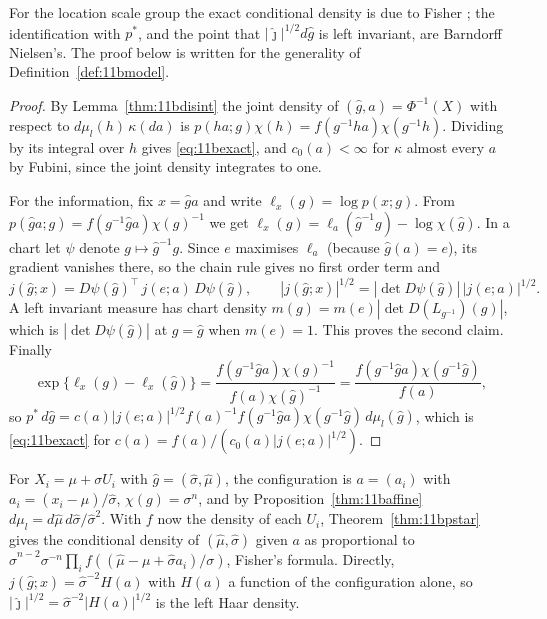 For the location scale group the exact conditional density is due to Fisher \cite{fisher1934}; the identification with $p^*$, and the point that $|\hat\jmath|^{1/2}d\hat g$ is left invariant, are Barndorff Nielsen's. The proof below is written for the generality of Definition~\ref{def:11bmodel}.

\begin{proof}
By Lemma~\ref{thm:11bdisint} the joint density of $(\hat g,a)=\Phi^{-1}(X)$ with respect to $d\mu_l(h)\,\kappa(da)$ is $p(ha;g)\chi(h)=f(g^{-1}ha)\chi(g^{-1}h)$. Dividing by its integral over $h$ gives \eqref{eq:11bexact}, and $c_0(a)<\infty$ for $\kappa$ almost every $a$ by Fubini, since the joint density integrates to one.

For the information, fix $x=\hat g a$ and write $\ell_x(g)=\log p(x;g)$. From $p(\hat ga;g)=f(g^{-1}\hat ga)\chi(g)^{-1}$ we get $\ell_x(g)=\ell_a(\hat g^{-1}g)-\log\chi(\hat g)$. In a chart let $\psi$ denote $g\mapsto\hat g^{-1}g$. Since $e$ maximises $\ell_a$ (because $\hat g(a)=e$), its gradient vanishes there, so the chain rule gives no first order term and
\[
j(\hat g;x)=D\psi(\hat g)^{\top}\,j(e;a)\,D\psi(\hat g),\qquad |j(\hat g;x)|^{1/2}=|\det D\psi(\hat g)|\,|j(e;a)|^{1/2}.
\]
A left invariant measure has chart density $m(g)=m(e)|\det D(L_{g^{-1}})(g)|$, which is $|\det D\psi(\hat g)|$ at $g=\hat g$ when $m(e)=1$. This proves the second claim. Finally
\[
\exp\{\ell_x(g)-\ell_x(\hat g)\}=\frac{f(g^{-1}\hat ga)\chi(g)^{-1}}{f(a)\chi(\hat g)^{-1}}=\frac{f(g^{-1}\hat ga)\chi(g^{-1}\hat g)}{f(a)},
\]
so $p^*\,d\hat g=c(a)|j(e;a)|^{1/2}f(a)^{-1}f(g^{-1}\hat ga)\chi(g^{-1}\hat g)\,d\mu_l(\hat g)$, which is \eqref{eq:11bexact} for $c(a)=f(a)/(c_0(a)|j(e;a)|^{1/2})$.
\end{proof}

\begin{example}\label{ex:11blocscale}
For $X_i=\mu+\sigma U_i$ with $\hat g=(\hat\sigma,\hat\mu)$, the configuration is $a=(a_i)$ with $a_i=(x_i-\hat\mu)/\hat\sigma$, $\chi(g)=\sigma^n$, and by Proposition~\ref{thm:11baffine} $d\mu_l=d\hat\mu\,d\hat\sigma/\hat\sigma^2$. With $f$ now the density of each $U_i$, Theorem~\ref{thm:11bpstar} gives the conditional density of $(\hat\mu,\hat\sigma)$ given $a$ as proportional to $\hat\sigma^{n-2}\sigma^{-n}\prod_if((\hat\mu-\mu+\hat\sigma a_i)/\sigma)$, Fisher's formula. Directly, $j(\hat g;x)=\hat\sigma^{-2}H(a)$ with $H(a)$ a function of the configuration alone, so $|\hat\jmath|^{1/2}=\hat\sigma^{-2}|H(a)|^{1/2}$ is the left Haar density.
\end{example}

